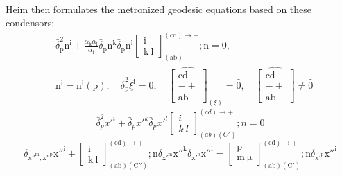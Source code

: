 \documentclass[12pt]{article}
\begin{document}
\begin{itemize}
\begin{equation}
\begin{aligned}
    \end{aligned} \tag{92a}
    \end{equation}
    Heim then formulates the metronized geodesic equations based on these condensors:
    \begin{equation}
    \begin{aligned}
    & \bar{\delta}_\mathrm{p}^2 \mathrm{n^i} + \frac{\alpha_\mathrm{k}\alpha_\mathrm{l}}{\alpha_\mathrm{i}} \bar{\delta}_\mathrm{p} \mathrm{n^k} \bar{\delta}_\mathrm{p} \mathrm{n^l} \left[ \begin{matrix} \mathrm{i} \\ \mathrm{k\ l} \end{matrix} \right]^{(\mathrm{cd}) \rightarrow +}_{(\mathrm{ab})} ; \mathrm{n} = 0, \\
    & \mathrm{n^i} = \mathrm{n^i}(\mathrm{p}), \quad \bar{\delta}_\mathrm{p}^2 \xi^\mathrm{i} = 0, \quad \widehat{\left[ \begin{matrix} \mathrm{cd} \\ - + \\ \mathrm{ab} \end{matrix} \right]}_{(\xi)} = \hat{0}, \quad \widehat{\left[ \begin{matrix} \mathrm{cd} \\ - + \\ \mathrm{ab} \end{matrix} \right]} \neq \hat{0}
    \end{aligned} \tag{93}
    \end{equation}
    \begin{equation}
    \bar{\delta}_p^2 x'^i + \bar{\delta}_p x'^k \bar{\delta}_p x'^l \left[ \begin{matrix} i \\ k\ l \end{matrix} \right]^{(cd) \rightarrow +}_{(ab)(C')} ; n = 0 \tag{93a}
    \end{equation}
    \begin{equation}
    \bar{\delta}_{\mathrm{x''^m},\mathrm{x''^p}} \mathrm{x''^i} + \left[ \begin{matrix} \mathrm{i} \\ \mathrm{k\ l} \end{matrix} \right]^{(\mathrm{cd}) \rightarrow +}_{(\mathrm{ab})(\mathrm{C''})} ; \mathrm{n} \bar{\delta}_{\mathrm{x'^m}} \mathrm{x''^k} \bar{\delta}_{\mathrm{x'^p}} \mathrm{x''^l} = \left[ \begin{matrix} \mathrm{p} \\ \mathrm{m\ \mu} \end{matrix} \right]^{(\mathrm{cd}) \rightarrow +}_{(\mathrm{ab})(\mathrm{C'})} ; \mathrm{n} \bar{\delta}_{\mathrm{x'^p}} \mathrm{x''^i} \tag{93b}

\end{equation}
\end{itemize}
\end{document}
